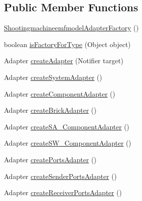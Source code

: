 \subsection*{Public Member Functions}
\begin{DoxyCompactItemize}
\item 
\hyperlink{classshootingmachineemfmodel_1_1util_1_1_shootingmachineemfmodel_adapter_factory_a028bbd44aec3d4e9f00bb30aed5c72d3}{Shootingmachineemfmodel\-Adapter\-Factory} ()
\item 
boolean \hyperlink{classshootingmachineemfmodel_1_1util_1_1_shootingmachineemfmodel_adapter_factory_a8ecac68d7d2bb7e30e7c9b52d2ebffde}{is\-Factory\-For\-Type} (Object object)
\item 
Adapter \hyperlink{classshootingmachineemfmodel_1_1util_1_1_shootingmachineemfmodel_adapter_factory_aa7a23bf98db574ff8c26f7a72cf6e4bb}{create\-Adapter} (Notifier target)
\item 
Adapter \hyperlink{classshootingmachineemfmodel_1_1util_1_1_shootingmachineemfmodel_adapter_factory_a685f07ad66b187a05cd93f298e6a4cdc}{create\-System\-Adapter} ()
\item 
Adapter \hyperlink{classshootingmachineemfmodel_1_1util_1_1_shootingmachineemfmodel_adapter_factory_a99b6962ef0c18bc43c15da6af5d8fd05}{create\-Component\-Adapter} ()
\item 
Adapter \hyperlink{classshootingmachineemfmodel_1_1util_1_1_shootingmachineemfmodel_adapter_factory_ae52edcc3b6ed5c2911866907dbaf749e}{create\-Brick\-Adapter} ()
\item 
Adapter \hyperlink{classshootingmachineemfmodel_1_1util_1_1_shootingmachineemfmodel_adapter_factory_a84048e25b540a8c5c3ea767e34265c48}{create\-S\-A\-\_\-\-Component\-Adapter} ()
\item 
Adapter \hyperlink{classshootingmachineemfmodel_1_1util_1_1_shootingmachineemfmodel_adapter_factory_ac1a73c99216c93fa7a37f59487984bd8}{create\-S\-W\-\_\-\-Component\-Adapter} ()
\item 
Adapter \hyperlink{classshootingmachineemfmodel_1_1util_1_1_shootingmachineemfmodel_adapter_factory_ab33c236ff5e9c5b8a7f8e0cdb86bccb7}{create\-Ports\-Adapter} ()
\item 
Adapter \hyperlink{classshootingmachineemfmodel_1_1util_1_1_shootingmachineemfmodel_adapter_factory_a84e83e5f8f3fa024aed8d4805c83e660}{create\-Sender\-Ports\-Adapter} ()
\item 
Adapter \hyperlink{classshootingmachineemfmodel_1_1util_1_1_shootingmachineemfmodel_adapter_factory_ae2e1e6733db32520c030260bd40e25f9}{create\-Receiver\-Ports\-Adapter} ()

\end{DoxyCompactItemize}
